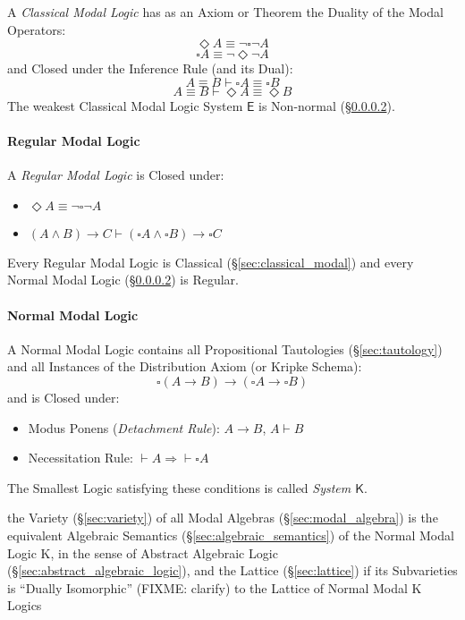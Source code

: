 A \emph{Classical Modal Logic} has as an Axiom or Theorem the Duality
of the Modal Operators:
\[
  \Diamond A \equiv \neg \square \neg A
\]\[
  \square A \equiv \neg \Diamond \neg A
\]
and Closed under the Inference Rule (and its Dual):
\[
  A \equiv B \vdash \square A \equiv \square B
\]\[
  A \equiv B \vdash \Diamond A \equiv \Diamond B
\]
The weakest Classical Modal Logic System $\mathsf{E}$ is Non-normal
(\S\ref{sec:normal_modal}).



\paragraph{Regular Modal Logic}\label{sec:regular_modal}\hfill

A \emph{Regular Modal Logic} is Closed under:
\begin {itemize}

\item $\Diamond A \equiv \neg \square \neg A$

\item $(A \wedge B) \rightarrow C \vdash
  (\square A \wedge \square B) \rightarrow \square C$

\end {itemize}
Every Regular Modal Logic is Classical (\S\ref{sec:classical_modal})
and every Normal Modal Logic (\S\ref{sec:normal_modal}) is Regular.



\paragraph{Normal Modal Logic}\label{sec:normal_modal}\hfill

A Normal Modal Logic contains all Propositional Tautologies
(\S\ref{sec:tautology}) and all Instances of the Distribution Axiom
(or Kripke Schema):
\[
  \square (A \rightarrow B) \rightarrow
  (\square A \rightarrow \square B)
\]
and is Closed under:
\begin{itemize}
  \item Modus Ponens (\emph{Detachment Rule}): $A \rightarrow B$, $A
    \vdash B$
  \item Necessitation Rule: $\vdash A \Rightarrow \vdash \square A$
\end{itemize}
The Smallest Logic satisfying these conditions is called \emph{System
  $\mathsf{K}$}.

the Variety (\S\ref{sec:variety}) of all Modal Algebras
(\S\ref{sec:modal_algebra}) is the equivalent Algebraic Semantics
(\S\ref{sec:algebraic_semantics}) of the Normal Modal Logic $\mathrm{K}$, in the
sense of Abstract Algebraic Logic (\S\ref{sec:abstract_algebraic_logic}), and
the Lattice (\S\ref{sec:lattice}) if its Subvarieties is ``Dually Isomorphic''
(FIXME: clarify) to the Lattice of Normal Modal $\mathrm{K}$ Logics



